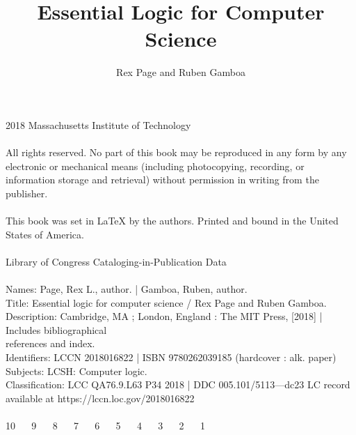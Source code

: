 \title{Essential Logic for Computer Science}
\author{Rex Page and Ruben Gamboa}


\vspace*{-3.1mm}
\halftitlepage
\clearpage





\titlepage


\begin{copyrightpage}
\textcopyright{} 2018 Massachusetts Institute of Technology\\
 \\
All rights reserved. No part of this book may be reproduced in any form by any electronic or mechanical means (including photocopying, recording, or information storage and retrieval) without permission in writing from the publisher.\\
 \\
This book was set in {LaTeX} by the authors.
Printed and bound in the United States of America.\\
 \\
Library of Congress Cataloging-in-Publication Data\\
 \\
Names: Page, Rex L., author. | Gamboa, Ruben, author.\\
Title: Essential logic for computer science / Rex Page and Ruben Gamboa.\\
Description: Cambridge, MA ; London, England : The MIT Press, [2018] |
Includes bibliographical\\%
references and index.\\
Identifiers: LCCN 2018016822 | ISBN 9780262039185 (hardcover : alk. paper)\\
Subjects:  LCSH: Computer logic.\\
Classification: LCC QA76.9.L63 P34 2018 | DDC 005.101/5113—dc23 LC record available at https://lccn.loc.gov/2018016822\\
 \\
10 ~~ 9 ~~ 8 ~~ 7 ~~ 6 ~~ 5 ~~ 4 ~~ 3 ~~ 2 ~~ 1
\end{copyrightpage}

